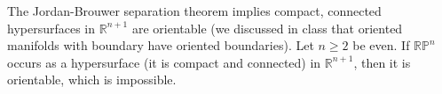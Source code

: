 \documentclass[11pt,leqno]{article}
\theoremstyle{plain}
\theoremstyle{definition}
\numberwithin{equation}{section}
\numberwithin{lem}{section}
\begin{document}
\begin{enumerate}
    The Jordan-Brouwer separation theorem implies compact, connected hypersurfaces in $\mathbb R^{n+1}$ are orientable (we discussed in class that oriented manifolds with boundary have oriented boundaries). Let $n\geq 2$ be even. If $\mathbb {RP}^{n}$ occurs as a hypersurface (it is compact and connected) in $\mathbb R^{n+1}$, then it is orientable, which is impossible.
\end{enumerate}
\end{document}
